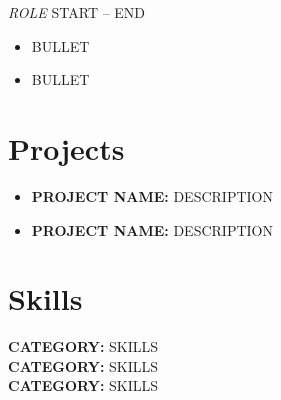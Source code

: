 \documentclass[11pt, letterpaper]{article}
\begin{document}
\vspace{4pt}
\textit{ROLE} \hfill START -- END
\begin{itemize}
  \item BULLET
  \item BULLET
\end{itemize}

\section{Projects}

\small
\begin{itemize}
  \item \textbf{PROJECT NAME:} DESCRIPTION
  \item \textbf{PROJECT NAME:} DESCRIPTION
\end{itemize}

\section{Skills}

\small
\textbf{CATEGORY:} SKILLS \\
\textbf{CATEGORY:} SKILLS \\
\textbf{CATEGORY:} SKILLS
\end{document}
